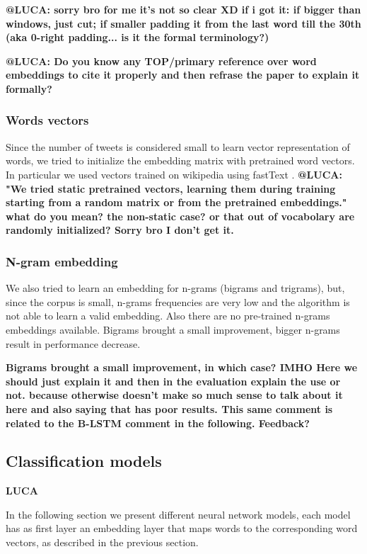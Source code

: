 \textbf{@LUCA: sorry bro for me it's not so clear XD if i got it: if bigger than windows, just cut; if smaller padding it from the last word till the 30th (aka 0-right padding... is it the formal terminology?)}

\textbf{@LUCA: Do you know any TOP/primary reference over word embeddings to cite it properly and then refrase the paper to explain it formally?}


\subsubsection{Words vectors}
Since the number of tweets is considered small to learn vector representation of words, we tried to initialize the embedding matrix with pretrained word vectors.
In particular we used vectors trained on wikipedia using fastText \cite{bojanowski2016enriching}.
\textbf{@LUCA: "We tried static pretrained vectors, learning them during training starting from a random matrix or from the pretrained embeddings." what do you mean? the non-static case? or that out of vocabolary are randomly initialized? Sorry bro I don't get it. }

\subsubsection{N-gram embedding}
We also tried to learn an embedding for n-grams (bigrams and trigrams), but, since the corpus is small, n-grams frequencies are very low and the algorithm is not able to learn a valid embedding.
Also there are no pre-trained n-grams embeddings available.
Bigrams brought a small improvement, bigger n-grams result in performance decrease.

\textbf{Bigrams brought a small improvement, in which case? IMHO Here we should just explain it and then in the evaluation explain the use or not. because otherwise doesn't make so much sense to talk about it here and also saying that has poor results. This same comment is related to the B-LSTM comment in the following. Feedback?}


\subsection{Classification models} \label{subsec:classificationModel}

\textbf{LUCA}

In the following section we present different neural network models, each model has as first layer an embedding layer that maps words to the corresponding word vectors, as described in the previous section.

